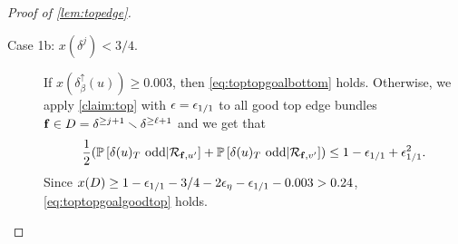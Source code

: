 \begin{proof}[Proof of \cref{lem:topedge}]
\begin{description}
\item [Case 1b: $x(\delta^{j}) < 3/4$.] 
If $x(\delta^\uparrow_\beta(u))\geq 0.003$, then  \eqref{eq:toptopgoalbottom} holds. %
Otherwise, we apply \cref{claim:top} with ${\epsilon} = {\epsilon}_{1/1}$ to all good top edge bundles ${\bf f} \in D=\delta^{\ge j +1} \smallsetminus \delta^{\ge \ell+1}$ and we get that 
$$\frac12({\mathbb{P}}\left[\delta(u)_T\text{ odd}|{\mathcal{R}}_{{\bf f},u'}\right] + {\mathbb{P}}\left[\delta(u)_T\text{ odd} | {\mathcal{R}}_{{\bf f},v'}\right])\leq 1- {\epsilon}_{1/1}+{\epsilon}_{1/1}^2.$$
Since $x(D)\geq 1-{\epsilon}_{1/1} - 3/4  - 2 {\epsilon}_\eta -{\epsilon}_{1/1}-0.003>  0.24 $,  \eqref{eq:toptopgoalgoodtop} holds. 
\end{description}





\end{proof}
